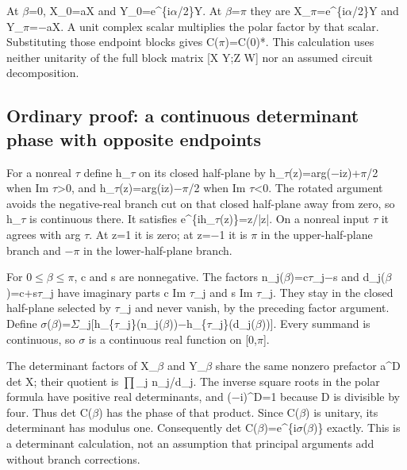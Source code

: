 \documentclass[11pt,a4paper]{article}
\begin{document}
At \ensuremath{\beta}=0, X\_0=aX and Y\_0=e\textasciicircum{}\{i\ensuremath{\alpha}/2\}Y. At \ensuremath{\beta}=\ensuremath{\pi} they are X\_\ensuremath{\pi}=e\textasciicircum{}\{i\ensuremath{\alpha}/2\}Y and Y\_\ensuremath{\pi}=\ensuremath{-}aX. A unit complex scalar multiplies the polar factor by that scalar. Substituting those endpoint blocks gives C(\ensuremath{\pi})=C(0)*. This calculation uses neither unitarity of the full block matrix [X Y;Z W] nor an assumed circuit decomposition.

\subsection{Ordinary proof: a continuous determinant phase with opposite endpoints}
For a nonreal \ensuremath{\tau} define h\_\ensuremath{\tau} on its closed half-plane by h\_\ensuremath{\tau}(z)=arg(\ensuremath{-}iz)+\ensuremath{\pi}/2 when Im \ensuremath{\tau}>0, and h\_\ensuremath{\tau}(z)=arg(iz)\ensuremath{-}\ensuremath{\pi}/2 when Im \ensuremath{\tau}<0. The rotated argument avoids the negative-real branch cut on that closed half-plane away from zero, so h\_\ensuremath{\tau} is continuous there. It satisfies e\textasciicircum{}\{ih\_\ensuremath{\tau}(z)\}=z/|z|. On a nonreal input \ensuremath{\tau} it agrees with arg \ensuremath{\tau}. At z=1 it is zero; at z=\ensuremath{-}1 it is \ensuremath{\pi} in the upper-half-plane branch and \ensuremath{-}\ensuremath{\pi} in the lower-half-plane branch.

For 0\ensuremath{\leq}\ensuremath{\beta}\ensuremath{\leq}\ensuremath{\pi}, c and s are nonnegative. The factors n\_j(\ensuremath{\beta})=c\ensuremath{\tau}\_j\ensuremath{-}s and d\_j(\ensuremath{\beta})=c+s\ensuremath{\tau}\_j have imaginary parts c Im \ensuremath{\tau}\_j and s Im \ensuremath{\tau}\_j. They stay in the closed half-plane selected by \ensuremath{\tau}\_j and never vanish, by the preceding factor argument. Define \ensuremath{\sigma}(\ensuremath{\beta})=\ensuremath{\Sigma}\_j[h\_\{\ensuremath{\tau}\_j\}(n\_j(\ensuremath{\beta}))\ensuremath{-}h\_\{\ensuremath{\tau}\_j\}(d\_j(\ensuremath{\beta}))]. Every summand is continuous, so \ensuremath{\sigma} is a continuous real function on [0,\ensuremath{\pi}].

The determinant factors of X\_\ensuremath{\beta} and Y\_\ensuremath{\beta} share the same nonzero prefactor a\textasciicircum{}D det X; their quotient is \ensuremath{\prod}\_j n\_j/d\_j. The inverse square roots in the polar formula have positive real determinants, and (\ensuremath{-}i)\textasciicircum{}D=1 because D is divisible by four. Thus det C(\ensuremath{\beta}) has the phase of that product. Since C(\ensuremath{\beta}) is unitary, its determinant has modulus one. Consequently det C(\ensuremath{\beta})=e\textasciicircum{}\{i\ensuremath{\sigma}(\ensuremath{\beta})\} exactly. This is a determinant calculation, not an assumption that principal arguments add without branch corrections.
\end{document}
